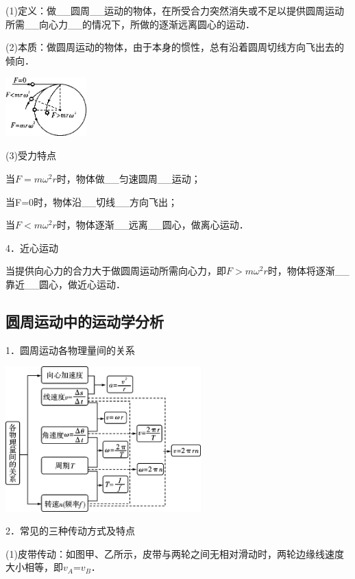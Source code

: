 \documentclass[cn,10.5pt,chinese,mac,chinesefont=founder]{elegantbook}
\begin{document}
(1)定义：做\_\_圆周\_\_运动的物体，在所受合力突然消失或不足以提供圆周运动所需\_\_向心力\_\_的情况下，所做的逐渐远离圆心的运动．

(2)本质：做圆周运动的物体，由于本身的惯性，总有沿着圆周切线方向飞出去的倾向．

\begin{center}\includegraphics[width=1.23333in,height=0.9in]{media/image178.png}\end{center}

(3)受力特点

当$F=mω^2r$时，物体做\_\_匀速圆周\_\_运动；

当F=0时，物体沿\_\_切线\_\_方向飞出；

当$F<mω^2r$时，物体逐渐\_\_远离\_\_圆心，做离心运动．

4．近心运动

当提供向心力的合力大于做圆周运动所需向心力，即$F>mω^2r$时，物体将逐渐\_\_靠近\_\_圆心，做近心运动．

\newpage
\subsection{圆周运动中的运动学分析}

1．圆周运动各物理量间的关系

\begin{center}\includegraphics[width=2.96667in,height=2.2in]{media/image180.png}\end{center}

2．常见的三种传动方式及特点

(1)皮带传动：如图甲、乙所示，皮带与两轮之间无相对滑动时，两轮边缘线速度大小相等，即$v_A$=$v_B$．
\end{document}
